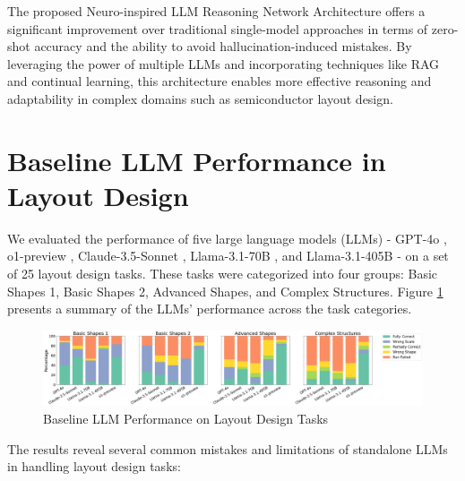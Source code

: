 \documentclass{article}
\begin{document}
The proposed Neuro-inspired LLM Reasoning Network Architecture offers a significant improvement over traditional single-model approaches in terms of zero-shot accuracy and the ability to avoid hallucination-induced mistakes. By leveraging the power of multiple LLMs and incorporating techniques like RAG and continual learning, this architecture enables more effective reasoning and adaptability in complex domains such as semiconductor layout design.

\section{Baseline LLM Performance in Layout Design}

We evaluated the performance of five large language models (LLMs) - GPT-4o \cite{GPT-4o}, o1-preview \cite{o1-preview}, Claude-3.5-Sonnet \cite{Claude-3.5-Sonnet}, Llama-3.1-70B \cite{Llama-3.1-70B}, and Llama-3.1-405B \cite{Llama-3.1-405B} - on a set of 25 layout design tasks. These tasks were categorized into four groups: Basic Shapes 1, Basic Shapes 2, Advanced Shapes, and Complex Structures. Figure \ref{fig:baseline-llm-performance} presents a summary of the LLMs' performance across the task categories.

\begin{figure}[h]
  \centering
  \includegraphics[width=\textwidth]{baseline-llm-performance.png}
  \caption{Baseline LLM Performance on Layout Design Tasks}
  \label{fig:baseline-llm-performance}
\end{figure}

The results reveal several common mistakes and limitations of standalone LLMs in handling layout design tasks:
\end{document}
